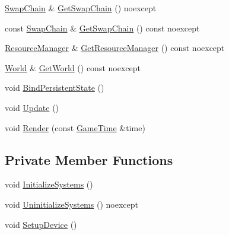 \begin{DoxyCompactItemize}
\item 
\mbox{\hyperlink{classmage_1_1rendering_1_1_swap_chain}{Swap\+Chain}} \& \mbox{\hyperlink{classmage_1_1rendering_1_1_manager_1_1_impl_aa2f6c98780d9e035ae1eb3822e5e3810}{Get\+Swap\+Chain}} () noexcept
\item 
const \mbox{\hyperlink{classmage_1_1rendering_1_1_swap_chain}{Swap\+Chain}} \& \mbox{\hyperlink{classmage_1_1rendering_1_1_manager_1_1_impl_a7595cf95fc4af88ae359d77fce0681b3}{Get\+Swap\+Chain}} () const noexcept
\item 
\mbox{\hyperlink{classmage_1_1rendering_1_1_resource_manager}{Resource\+Manager}} \& \mbox{\hyperlink{classmage_1_1rendering_1_1_manager_1_1_impl_a604da1cb1bf3eb9783320ee1366c43a4}{Get\+Resource\+Manager}} () const noexcept
\item 
\mbox{\hyperlink{classmage_1_1rendering_1_1_world}{World}} \& \mbox{\hyperlink{classmage_1_1rendering_1_1_manager_1_1_impl_a01dbb540b262170ae3518c9a72945046}{Get\+World}} () const noexcept
\item 
void \mbox{\hyperlink{classmage_1_1rendering_1_1_manager_1_1_impl_a0ffe370f901194395d73f641f72313d6}{Bind\+Persistent\+State}} ()
\item 
void \mbox{\hyperlink{classmage_1_1rendering_1_1_manager_1_1_impl_a8fd123eb4cc188a207ca0bb9824c3f59}{Update}} ()
\item 
void \mbox{\hyperlink{classmage_1_1rendering_1_1_manager_1_1_impl_a65fcce597a9e4066d2dcded9990874e3}{Render}} (const \mbox{\hyperlink{classmage_1_1_game_time}{Game\+Time}} \&time)
\end{DoxyCompactItemize}
\subsection*{Private Member Functions}
\begin{DoxyCompactItemize}
\item 
void \mbox{\hyperlink{classmage_1_1rendering_1_1_manager_1_1_impl_abb9706b54c07c3493ef906667051c336}{Initialize\+Systems}} ()
\item 
void \mbox{\hyperlink{classmage_1_1rendering_1_1_manager_1_1_impl_a0e2979e4330a5148da2fa6cabd19078f}{Uninitialize\+Systems}} () noexcept
\item 
void \mbox{\hyperlink{classmage_1_1rendering_1_1_manager_1_1_impl_ab5685e722d3d8afa96f30955c2d7c8a6}{Setup\+Device}} ()
\end{DoxyCompactItemize}

